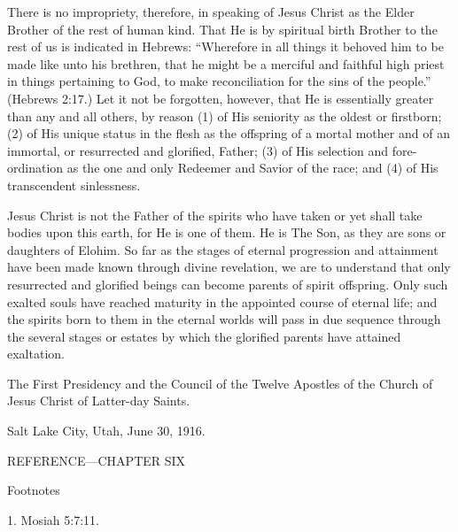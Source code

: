 There is no impropriety, therefore, in speaking of Jesus Christ as the Elder Brother of the rest
of human kind. That He is by spiritual birth Brother to the rest of us is indicated in Hebrews:
``Wherefore in all things it behoved him to be made like unto his brethren, that he might be a
merciful and faithful high priest in things pertaining to God, to make reconciliation for the
sins of the people.'' (Hebrews 2:17.) Let it not be forgotten, however, that He is essentially
greater than any and all others, by reason (1) of His seniority as the oldest or firstborn; (2) of
His unique status in the flesh as the offspring of a mortal mother and of an immortal, or
resurrected and glorified, Father; (3) of His selection and fore-ordination as the one and only
Redeemer and Savior of the race; and (4) of His transcendent sinlessness.

Jesus Christ is not the Father of the spirits who have taken or yet shall take bodies upon this
earth, for He is one of them. He is The Son, as they are sons or daughters of Elohim. So far
as the stages of eternal progression and attainment have been made known through divine
revelation, we are to understand that only resurrected and glorified beings can become
parents of spirit offspring. Only such exalted souls have reached maturity in the appointed
course of eternal life; and the spirits born to them in the eternal worlds will pass in due
sequence through the several stages or estates by which the glorified parents have attained
exaltation.

The First Presidency and the Council of the Twelve Apostles of the Church of Jesus Christ of
Latter-day Saints.

Salt Lake City, Utah, June 30, 1916.

\newpage
REFERENCE—CHAPTER SIX

Footnotes

1. Mosiah 5:7:11.
